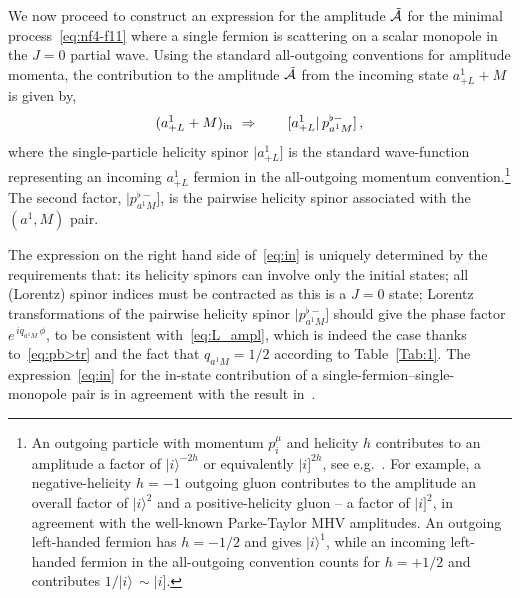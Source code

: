 \documentclass[a4paper,11pt]{article}
\begin{document}
\medskip

We now proceed to construct an expression for the amplitude $\tilde{\cal A}$ for the minimal process~\eqref{eq:nf4-f11} where a single fermion is scattering on a scalar monopole in the $J=0$ partial wave.
%
Using the standard all-outgoing conventions for amplitude momenta, the contribution to the amplitude $\tilde{\cal A}$ from the incoming state $a_{+L}^1 + M $ is given by,
\begin{equation}
\label{eq:in}
 (a_{+L}^1+  M)_{\rm in} \,\, \Rightarrow \qquad   [a_{+L}^1 | \, p^{\flat -}_{a^1 M} ]\,,
\end{equation}
where the single-particle helicity spinor
$|a_{+L}^1 ]$  is the standard wave-function representing an incoming $a_{+L}^1$ fermion in the all-outgoing momentum convention.\footnote{An outgoing particle 
with momentum $p_i^\mu$ and helicity $h$ contributes to an amplitude a factor of $|i\rangle^{-2h}$ or equivalently $|i]^{2h}$, see 
e.g.~\cite{Dixon:1996wi,Arkani-Hamed:2017jhn}. For example, a negative-helicity $h=-1$ outgoing gluon contributes to the amplitude an overall factor of  $|i\rangle^{2}$ and a positive-helicity gluon -- a factor of $|i]^{2}$, in agreement with the well-known Parke-Taylor MHV amplitudes. An outgoing left-handed fermion has $h=-1/2$ and gives $|i\rangle^{1}$, while  
an incoming left-handed fermion in the all-outgoing convention counts for $h={+1/2}$ and contributes $1/ |i\rangle \,\sim | i]$. }
The second factor,
$| p^{\flat -}_{a^1 M} ]$, is the pairwise helicity spinor associated with the $(a^1,M)$ pair.


The expression on the right hand side of~\eqref{eq:in} is uniquely determined by the requirements
that: its helicity spinors can involve only the initial states; all (Lorentz) spinor indices must be contracted as this is a $J=0$ state; Lorentz transformations of the pairwise
helicity spinor $| p^{\flat -}_{a^1 M} ]$ should give the phase factor $e^{\, i q_{a^1M} \, \phi}$, to be consistent with~\eqref{eq:L_ampl}, which is indeed the case thanks 
to~\eqref{eq:pb>tr} and the fact that $q_{a^1M}=1/2$ according to Table~\ref{Tab:1}.  The expression~\eqref{eq:in} for the in-state contribution of a  
single-fermion--single-monopole pair is in agreement with the result in~\cite{Csaki:2022qtz}. 
\end{document}
